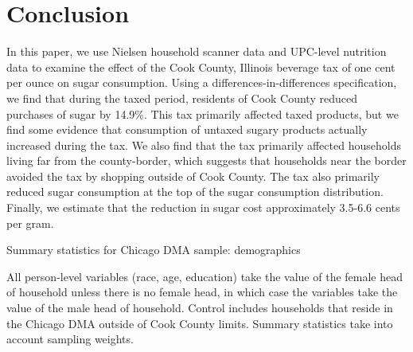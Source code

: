 \documentclass[12pt]{article}
\begin{document}

\section{Conclusion} \label{conclusion}

In this paper, we use Nielsen household scanner data and UPC-level nutrition data to examine the effect of the Cook County, Illinois beverage tax of one cent per ounce on sugar consumption. Using a differences-in-differences specification, we find that during the taxed period, residents of Cook County reduced purchases of sugar by 14.9\%. This tax primarily affected taxed products, but we find some evidence that consumption of untaxed sugary products actually increased during the tax. We also find that the tax primarily affected households living far from the county-border, which suggests that households near the border avoided the tax by shopping outside of Cook County. The tax also primarily reduced sugar consumption at the top of the sugar consumption distribution. Finally, we estimate that the reduction in sugar cost approximately 3.5-6.6 cents per gram. 






\clearpage
\printbibliography


\singlespacing
\clearpage
\begin{table}
\caption{Summary statistics for Chicago DMA sample: demographics}
\label{summary_table}

\footnotesize{All person-level variables (race, age, education) take the value of the female head of household unless there is no female head, in which case the variables take the value of the male head of household. Control includes households that reside in the Chicago DMA outside of Cook County limits. Summary statistics take into account sampling weights.}
\end{table}


\clearpage


\clearpage


\clearpage


\clearpage

\end{document}
